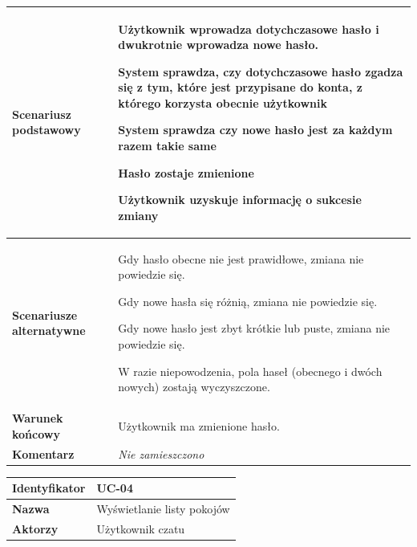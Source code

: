 {\begin{tabular}{ | l | l | }
	\hline
		\parbox[t]{4cm}{\textbf{Scenariusz podstawowy}} & \parbox[t]{11cm}{
			\begin{enumreq}
				\item Użytkownik wprowadza dotychczasowe hasło i dwukrotnie
				wprowadza nowe hasło.
				\item System sprawdza, czy dotychczasowe hasło zgadza się
				z tym, które jest przypisane do konta, z którego korzysta
				obecnie użytkownik
				\item System sprawdza czy nowe hasło jest za każdym razem
				takie same
				\item Hasło zostaje zmienione
				\item Użytkownik uzyskuje informację o sukcesie zmiany
			\end{enumreq}
		}
		\\
		
	\hline
		\parbox[t]{4cm}{\textbf{Scenariusze alternatywne}} & \parbox[t]
		{11cm}{
			\begin{enumreq}
				\item Gdy hasło obecne nie jest prawidłowe, zmiana nie
				powiedzie się.
				\item Gdy nowe hasła się różnią, zmiana nie powiedzie się.
				\item Gdy nowe hasło jest zbyt krótkie lub puste, zmiana
				nie powiedzie się.
				\item W razie niepowodzenia, pola haseł (obecnego i dwóch
				nowych) zostają wyczyszczone.
			\end{enumreq}
		}
		\\
		
	\hline
		\parbox[t]{4cm}{\textbf{Warunek końcowy}} & \parbox[t]{11cm}{
			Użytkownik ma zmienione hasło.
		}
		\\
		
	\hline
		\parbox[t]{4cm}{\textbf{Komentarz}} & \parbox[t]{11cm}{
			\textit{Nie zamieszczono}
		}
		\\

	\hline
\end{tabular}

\vspace{2em}

\begin{tabular}{ | l | l | }
	\hline
		\textbf{Identyfikator} & 
		UC-04
		\\
		
	\hline
		\textbf{Nazwa} & 
		Wyświetlanie listy pokojów
		\\
		
	\hline
		\textbf{Aktorzy} & \parbox[t]{11cm}{
			Użytkownik czatu
		}\\
		 

\end{tabular}}

